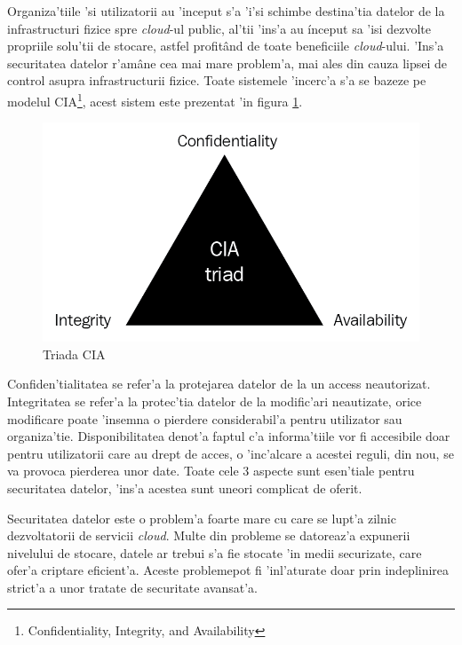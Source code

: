 \documentclass[12pt,a4paper,twoside]{report}
\begin{document}
Organiza'tiile 'si utilizatorii au 'inceput s'a 'i'si schimbe destina'tia datelor de la infrastructuri fizice spre \textit{cloud}-ul public, al'tii 'ins'a au ínceput sa 'isi dezvolte propriile solu'tii de stocare, astfel profitând de toate beneficiile \textit{cloud}-ului. 'Ins'a securitatea datelor r'amâne cea mai mare problem'a, mai ales din cauza lipsei de control asupra infrastructurii fizice\cite{cloudsecurityautomation}. Toate sistemele 'incerc'a s'a se bazeze pe modelul CIA\footnote{Confidentiality, Integrity, and Availability}, acest sistem este prezentat 'in figura \ref{cia_sist}.
\begin{figure}[H]
\begin{center}
\advance\leftskip-3cm
\advance\rightskip-3cm
\includegraphics[keepaspectratio=true,scale=0.38]{img/cia_triad.png}
\caption{Triada CIA}
\label{cia_sist}
\end{center}
\end{figure}
Confiden'tialitatea se refer'a la protejarea datelor de la un access neautorizat. Integritatea se refer'a la protec'tia datelor de la modific'ari neautizate, orice modificare poate 'insemna o pierdere considerabil'a pentru utilizator sau organiza'tie. Disponibilitatea denot'a faptul c'a informa'tiile vor fi accesibile doar pentru utilizatorii care au drept de acces, o 'inc'alcare a acestei reguli, din nou, se va provoca pierderea unor date. Toate cele 3 aspecte sunt esen'tiale pentru securitatea datelor, 'ins'a acestea sunt uneori complicat de oferit.

Securitatea datelor este o problem'a foarte mare cu care se lupt'a zilnic dezvoltatorii de servicii \textit{cloud}. Multe din probleme se datoreaz'a expunerii nivelului de stocare, datele ar trebui s'a fie stocate 'in medii securizate, care ofer'a criptare eficient'a. Aceste problemepot fi 'inl'aturate doar prin indeplinirea strict'a a unor tratate de securitate avansat'a.
\end{document}
